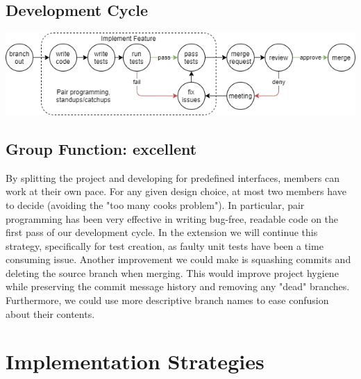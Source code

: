 \documentclass[11pt]{article}
\begin{document}
    \subsection*{Development Cycle}
        \begin{center}
            \includegraphics[width = \textwidth]{development_cycle}
        \end{center}
    \subsection*{Group Function: \textcolor{OliveGreen}{excellent}}
        By splitting the project and developing for predefined interfaces, members can work at their own pace. For any given design choice, at most two members have to decide (avoiding the "too many cooks problem").
        \newline\newline
        In particular, pair programming has been very effective in writing bug-free, readable code on the first pass of our development cycle. In the extension we will continue this strategy, specifically for test creation, as faulty unit tests have been a time consuming issue. 
        \newline\newline
        Another improvement we could make is squashing commits and deleting the source branch when merging. This would improve project hygiene while preserving the commit message history and removing any "dead" branches. Furthermore, we could use more descriptive branch names to ease confusion about their contents.

\section{Implementation Strategies}
\end{document}
